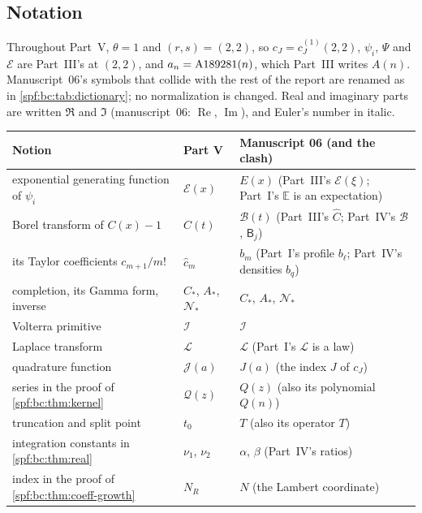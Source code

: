 \documentclass[11pt]{article}
\numberwithin{equation}{section}
\theoremstyle{definition}
\theoremstyle{remark}
\theoremstyle{definition}
\newcommand{\E}{\mathbb E}
\newcommand{\Aone}{\textnormal{A189281}}
\newcommand{\bcC}{C_{\!*}}
\newcommand{\bcA}{A_{\!*}}
\newcommand{\bcN}{\mathcal N_{\!*}}
\newcommand{\bcI}{\mathcal I}
\begin{document}
\subsection{Notation}
\label{spf:bc:sec:notation}

Throughout Part~V, $\theta=1$ and $(r,s)=(2,2)$, so $c_J=c_J^{(1)}(2,2)$,
$\psi_i$, $\Psi$ and $\mathcal E$ are Part~III's at $(2,2)$, and
$a_n=\Aone(n)$, which Part~III writes $A(n)$. Manuscript~06's symbols that
collide with the rest of the report are renamed as in
\cref{spf:bc:tab:dictionary}; no normalization is changed. Real and
imaginary parts are written $\Re$ and $\Im$ (manuscript~06:
$\operatorname{Re}$, $\operatorname{Im}$), and Euler's number in italic.

\begin{table}[htbp]
\centering\small
\renewcommand{\arraystretch}{1.12}
\begin{tabular}{@{}>{\raggedright\arraybackslash}p{}>{\raggedright\arraybackslash}p{}>{\raggedright\arraybackslash}p{}@{}}
\toprule
Notion & Part V & Manuscript 06 (and the clash)\\
\midrule
exponential generating function of $\psi_i$ & $\mathcal E(x)$ & $E(x)$ (Part~III's $\mathcal E(\xi)$; Part~I's $\E$ is an expectation)\\
Borel transform of $C(x)-1$ & $\widehat C(t)$ & $\mathcal B(t)$ (Part~III's $\widehat C$; Part~IV's $\mathcal B$, $\mathsf B_j$)\\
its Taylor coefficients $c_{m+1}/m!$ & $\hat c_m$ & $b_m$ (Part~I's profile $b_\ell$; Part~IV's densities $b_q$)\\
completion, its Gamma form, inverse & $\bcC$, $\bcA$, $\bcN$ & $C_*$, $A_*$, $\mathcal N_*$\\
Volterra primitive & $\bcI$ & $\mathcal I$\\
Laplace transform & $\mathscr L$ & $\mathcal L$ (Part~I's $\mathcal L$ is a law)\\
quadrature function & $\mathcal J(a)$ & $J(a)$ (the index $J$ of $c_J$)\\
series in the proof of \cref{spf:bc:thm:kernel} & $\mathcal Q(z)$ & $Q(z)$ (also its polynomial $Q(n)$)\\
truncation and split point & $t_0$ & $T$ (also its operator $T$)\\
integration constants in \cref{spf:bc:thm:real} & $\nu_1$, $\nu_2$ & $\alpha$, $\beta$ (Part~IV's ratios)\\
index in the proof of \cref{spf:bc:thm:coeff-growth} & $N_R$ & $N$ (the Lambert coordinate)\\

\end{tabular}
\end{table}
\end{document}
